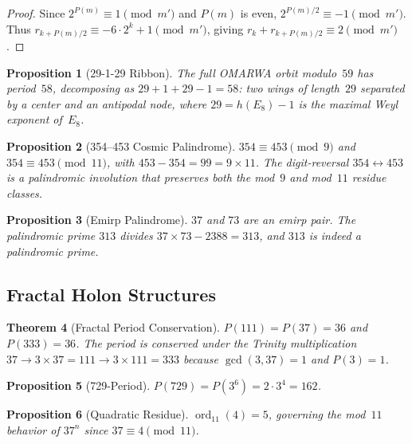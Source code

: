 \documentclass[11pt, a4paper]{article}
\theoremstyle{plain}
\newtheorem{theorem}{Theorem}[section]
\newtheorem{proposition}[theorem]{Proposition}
\theoremstyle{definition}
\theoremstyle{remark}
\newcommand{\ord}{\operatorname{ord}}
\begin{document}
\begin{proof}
Since $2^{P(m)} \equiv 1 \pmod{m'}$ and $P(m)$ is even,
$2^{P(m)/2} \equiv -1 \pmod{m'}$. Thus
$r_{k+P(m)/2} \equiv -6 \cdot 2^k + 1 \pmod{m'}$, giving
$r_k + r_{k+P(m)/2} \equiv 2 \pmod{m'}$.
\end{proof}

\begin{proposition}[29-1-29 Ribbon]\label{prop:ribbon29}
The full OMARWA orbit modulo~$59$ has period~$58$, decomposing as
$29 + 1 + 29 - 1 = 58$: two wings of length~$29$ separated by a
center and an antipodal node, where $29 = h(E_8) - 1$ is the maximal
Weyl exponent of~$E_8$.
\end{proposition}

\begin{proposition}[354--453 Cosmic Palindrome]\label{prop:354-453}
$354 \equiv 453 \pmod{9}$ and $354 \equiv 453 \pmod{11}$, with
$453 - 354 = 99 = 9 \times 11$.
The digit-reversal $354 \leftrightarrow 453$ is a palindromic
involution that preserves both the mod~$9$ and mod~$11$ residue classes.
\end{proposition}

\begin{proposition}[Emirp Palindrome]\label{prop:emirp-palindrome}
$37$ and $73$ are an emirp pair. The palindromic prime $313$ divides
$37 \times 73 - 2388 = 313$, and $313$ is indeed a palindromic prime.
\end{proposition}

\subsection{Fractal Holon Structures}

\begin{theorem}[Fractal Period Conservation]\label{thm:fractal-holon}
$P(111) = P(37) = 36$ and $P(333) = 36$. The period is conserved under
the Trinity multiplication $37 \to 3 \times 37 = 111 \to
3 \times 111 = 333$ because $\gcd(3, 37) = 1$ and $P(3) = 1$.
\end{theorem}

\begin{proposition}[729-Period]\label{prop:729}
$P(729) = P(3^6) = 2 \cdot 3^4 = 162$.
\end{proposition}

\begin{proposition}[Quadratic Residue]\label{prop:quad-res}
$\ord_{11}(4) = 5$, governing the mod~$11$ behavior of $37^n$
since $37 \equiv 4 \pmod{11}$.
\end{proposition}
\end{document}
